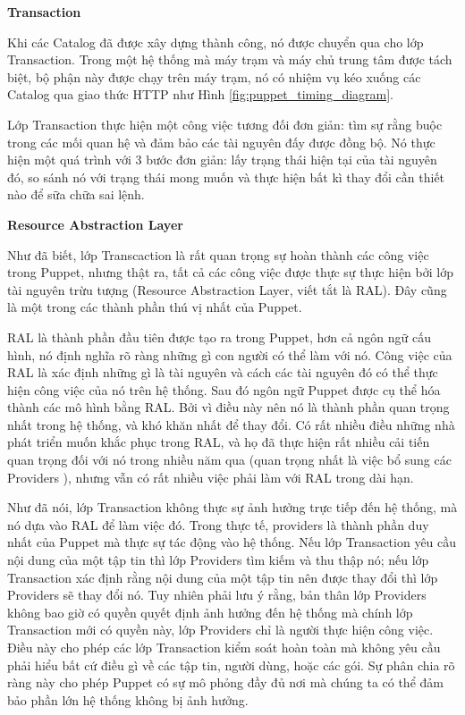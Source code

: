 \textbf{\large Transaction}


Khi các Catalog đã được xây dựng thành công, nó được chuyển qua cho lớp Transaction. Trong một hệ thống mà máy trạm và máy chủ trung tâm được tách biệt, bộ phận này được chạy trên máy trạm, nó có nhiệm vụ kéo xuống các Catalog qua giao thức HTTP như Hình \ref{fig:puppet_timing_diagram}.

Lớp Transaction thực hiện một công việc tương đối đơn giản: tìm sự rằng buộc trong các mối quan hệ và đảm bảo các tài nguyên đấy được đồng bộ. Nó thực hiện một quá trình với 3 bước đơn giản: lấy trạng thái hiện tại của tài nguyên đó, so sánh nó với trạng thái mong muốn và thực hiện bất kì thay đổi cần thiết nào để sữa chữa sai lệnh.


\textbf{\large Resource Abstraction Layer}


Như đã biết, lớp Transcaction là rất quan trọng sự hoàn thành các công việc trong Puppet, nhưng thật ra, tất cả các công việc được thực sự thực hiện bởi lớp tài nguyên trừu tượng (Resource Abstraction Layer, viết tắt là RAL). Đây cũng là một trong các thành phần thú vị nhất của Puppet.

RAL là thành phần đầu tiên được tạo ra trong Puppet, hơn cả ngôn ngữ cấu hình, nó định nghĩa rõ ràng những gì con người có thể làm với nó. Công việc của RAL là xác định những gì là tài nguyên và cách các tài nguyên đó có thể thực hiện công việc của nó trên hệ thống. Sau đó ngôn ngữ Puppet được cụ thể hóa thành các mô hình bằng RAL. Bởi vì điều này nên nó là thành phần quan trọng nhất trong hệ thống, và khó khăn nhất để thay đổi. Có rất nhiều điều những nhà phát triển muốn khắc phục trong RAL, và họ đã thực hiện rất nhiều cải tiến quan trọng đối với nó trong nhiều năm qua (quan trọng nhất là việc bổ sung các Providers ), nhưng vẫn có rất nhiều việc phải làm với RAL trong dài hạn.

Như đã nói, lớp Transaction không thực sự ảnh hưởng  trực tiếp đến hệ thống, mà nó dựa vào RAL để làm việc đó. Trong thực tế, providers là thành phần duy nhất của Puppet mà thực sự tác động vào hệ thống. Nếu lớp Transaction yêu cầu nội dung của một tập tin thì lớp Providers tìm kiếm và thu thập nó; nếu lớp Transaction xác định rằng nội dung của một tập tin nên được thay đổi thì lớp Providers sẽ thay đổi nó. Tuy nhiên phải lưu ý rằng, bản thân lớp Providers không bao giờ có quyền quyết định ảnh hưởng đến hệ thống mà chính lớp Transaction mới có quyền này, lớp Providers chỉ là người thực hiện công việc. Điều này cho phép các lớp Transaction kiểm soát hoàn toàn mà không yêu cầu phải hiểu bất cứ điều gì về các tập tin, người dùng, hoặc các gói. Sự phân chia rõ ràng này cho phép Puppet có sự mô phỏng đầy đủ nơi mà chúng ta có thể đảm bảo phần lớn hệ thống không bị ảnh hưởng.


